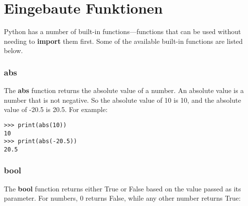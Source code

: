 

\chapter{Eingebaute Funktionen}\label{app:builtinfunctions}

Python has a number of built-in functions---functions that can be used without needing to \textbf{import} them first.  Some of the available built-in functions are listed below.

\subsection*{abs}

The \textbf{abs} function returns the absolute value of a number.  An absolute value is a number that is not negative.  So the absolute value of 10 is 10, and the absolute value of -20.5 is 20.5.  For example:

\begin{Verbatim}[frame=single]
>>> print(abs(10))
10
>>> print(abs(-20.5))
20.5
\end{Verbatim}

\subsection*{bool}

The \textbf{bool} function returns either True or False based on the value passed as its parameter. For numbers, 0 returns False, while any other number returns True:

